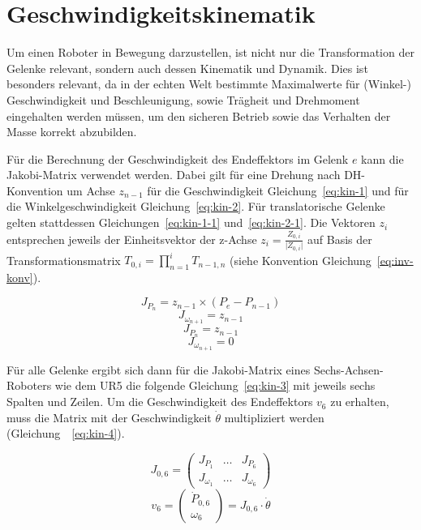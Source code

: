 \section{Geschwindigkeitskinematik}\label{sec:geschwindigkeitskinematik}

Um einen Roboter in Bewegung darzustellen, ist nicht nur die Transformation der Gelenke relevant, sondern auch dessen Kinematik und Dynamik.
Dies ist besonders relevant, da in der echten Welt bestimmte Maximalwerte für (Winkel-) Geschwindigkeit und Beschleunigung, sowie Trägheit und Drehmoment eingehalten werden müssen, um den sicheren Betrieb sowie das Verhalten der Masse korrekt abzubilden.

Für die Berechnung der Geschwindigkeit des Endeffektors im Gelenk $e$ kann die Jakobi-Matrix verwendet werden.
Dabei gilt für eine Drehung nach DH-Konvention um Achse $z_{n-1}$ für die Geschwindigkeit Gleichung~\ref{eq:kin-1} und für die Winkelgeschwindigkeit Gleichung~\ref{eq:kin-2}.
Für translatorische Gelenke gelten stattdessen Gleichungen~\ref{eq:kin-1-1} und~\ref{eq:kin-2-1}.
Die Vektoren $z_{i}$ entsprechen jeweils der Einheitsvektor der z-Achse $z_{i} = \frac{Z_{0,i}}{\lvert Z_{0,i} \rvert}$ auf Basis der Transformationsmatrix $T_{0,i} = \prod_{n=1}^{i}T_{n-1,n}$ (siehe Konvention Gleichung~\ref{eq:inv-konv}).

\begin{equation}
    J_{P_{n}} = z_{n-1} \times (P_{e} - P_{n-1}) \label{eq:kin-1}
\end{equation}
\begin{equation}
    J_{\omega_{n+1}} = z_{n-1} \label{eq:kin-2}
\end{equation}
\begin{equation}
    J_{P_{n}} = z_{n-1} \label{eq:kin-1-1}
\end{equation}
\begin{equation}
    J_{\omega_{n+1}} = 0 \label{eq:kin-2-1}
\end{equation}

Für alle Gelenke ergibt sich dann für die Jakobi-Matrix eines Sechs-Achsen-Roboters wie dem UR5 die folgende Gleichung~\ref{eq:kin-3} mit jeweils sechs Spalten und Zeilen.
Um die Geschwindigkeit des Endeffektors $v_6$ zu erhalten, muss die Matrix mit der Geschwindigkeit $\dot{\theta}$ multipliziert werden (Gleichung~~\ref{eq:kin-4}).

\begin{equation}
    J_{0,6}=
    \begin{pmatrix}
        J_{P_1}      & \dots & J_{P_6}      \\
        J_{\omega_1} & \dots & J_{\omega_6}
    \end{pmatrix}\label{eq:kin-3}
\end{equation}
\begin{equation}
    v_6 =
    \begin{pmatrix}
        \dot{P}_{0,6} \\ \omega_6
    \end{pmatrix} =
    J_{0,6}\cdot\dot{\theta}
    \label{eq:kin-4}
\end{equation}